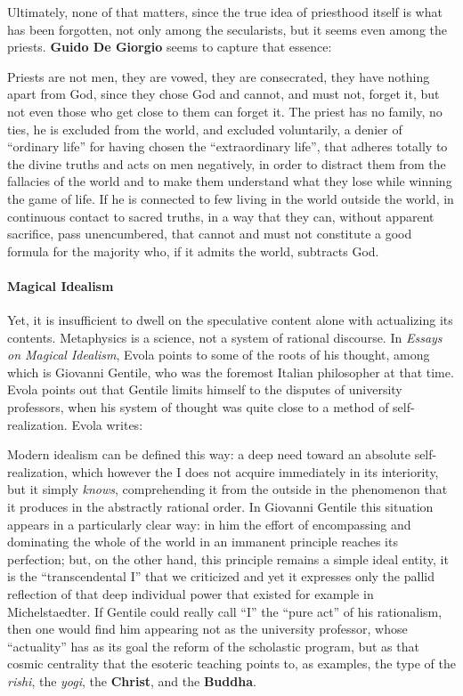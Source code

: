 Ultimately, none of that matters, since the true idea of priesthood itself is what has been forgotten, not only among the secularists, but it seems even among the priests. \textbf{Guido De Giorgio} seems to capture that essence:

\begin{quotex}
Priests are not men, they are vowed, they are consecrated, they have nothing apart from God, since they chose God and cannot, and must not, forget it, but not even those who get close to them can forget it. The priest has no family, no ties, he is excluded from the world, and excluded voluntarily, a denier of ``ordinary life'' for having chosen the ``extraordinary life'', that adheres totally to the divine truths and acts on men negatively, in order to distract them from the fallacies of the world and to make them understand what they lose while winning the game of life. If he is connected to few living in the world outside the world, in continuous contact to sacred truths, in a way that they can, without apparent sacrifice, pass unencumbered, that cannot and must not constitute a good formula for the majority who, if it admits the world, subtracts God.
\end{quotex}


\paragraph{Magical Idealism}


Yet, it is insufficient to dwell on the speculative content alone with actualizing its contents. Metaphysics is a science, not a system of rational discourse. In \emph{Essays on Magical Idealism}, Evola points to some of the roots of his thought, among which is Giovanni Gentile, who was the foremost Italian philosopher at that time. Evola points out that Gentile limits himself to the disputes of university professors, when his system of thought was quite close to a method of self-realization. Evola writes:

\begin{quotex}
Modern idealism can be defined this way: a deep need toward an absolute self-realization, which however the I does not acquire immediately in its interiority, but it simply \emph{knows}, comprehending it from the outside in the phenomenon that it produces in the abstractly rational order. In Giovanni Gentile this situation appears in a particularly clear way: in him the effort of encompassing and dominating the whole of the world in an immanent principle reaches its perfection; but, on the other hand, this principle remains a simple ideal entity, it is the ``transcendental I'' that we criticized and yet it expresses only the pallid reflection of that deep individual power that existed for example in Michelstaedter. If Gentile could really call ``I'' the ``pure act'' of his rationalism, then one would find him appearing not as the university professor, whose ``actuality'' has as its goal the reform of the scholastic program, but as that cosmic centrality that the esoteric teaching points to, as examples, the type of the \emph{rishi}, the \emph{yogi}, the \textbf{Christ}, and the \textbf{Buddha}.
\end{quotex}




